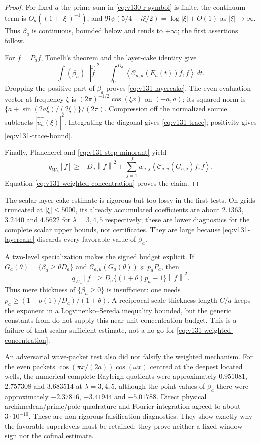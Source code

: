 \documentclass[11pt]{article}
\theoremstyle{remark}
\newcommand{\norm}[1]{\left\lVert #1\right\rVert}
\newcommand{\ip}[2]{\left\langle #1,#2\right\rangle}
\begin{document}
\begin{proof}
For fixed $a$ the prime sum in \eqref{eq:v130-r-symbol} is finite, the
continuum term is $O_a((1+|\xi|)^{-1})$, and
$\Re\psi(5/4+i\xi/2)=\log|\xi|+O(1)$ as $|\xi|\to\infty$.
Thus $\beta_a$ is continuous, bounded below and tends to $+\infty$;
the first assertions follow.

For $f=P_af$, Tonelli's theorem and the layer-cake identity give
\[
 \int(\beta_a)_-|\widehat{\widetilde f}|^2
 =\int_0^{D_a}\ip{\mathcal C_{a,u}(E_a(t))f}f\,dt.
\]
Dropping the positive part of $\beta_a$ proves
\eqref{eq:v131-layercake}.  The even evaluation vector at frequency
$\xi$ is $(2\pi)^{-1/2}\cos(\xi x)$ on $(-a,a)$; its squared norm is
$\{a+\sin(2a\xi)/(2\xi)\}/(2\pi)$.  Compression off the normalized
source subtracts $|\widehat{\widetilde u_a}(\xi)|^2$.  Integrating the
diagonal gives \eqref{eq:v131-trace}; positivity gives
\eqref{eq:v131-trace-bound}.

Finally, Plancherel and \eqref{eq:v131-step-minorant} yield
\[
 q_{W_\lambda}[f]
 \ge -D_a\norm f^2+
       \sum_{j=1}^Jw_{a,j}\ip{\mathcal C_{a,u}(G_{a,j})f}f.
\]
Equation \eqref{eq:v131-weighted-concentration} proves the claim.
\end{proof}

The scalar layer-cake estimate is rigorous but too lossy in the first
tests.  On grids truncated at $|\xi|\le5000$, its already accumulated
coefficients are about $2.1363$, $3.2440$ and $4.5622$ for
$\lambda=3,4,5$ respectively; these are lower diagnostics for the
complete scalar upper bounds, not certificates.  They are large
because \eqref{eq:v131-layercake} discards every favorable value of
$\beta_a$.

A two-level specialization makes the signed budget explicit.  If
$G_a(\theta)=\{\beta_a\ge\theta D_a\}$ and
$\mathcal C_{a,u}(G_a(\theta))\succeq p_aP_a$, then
\begin{equation}\label{eq:v131-two-level}
 q_{W_\lambda}[f]
 \ge D_a\{(1+\theta)p_a-1\}\norm f^2.
\end{equation}
Thus mere thickness of $\{\beta_a\ge0\}$ is insufficient: one needs
$p_a\ge(1-o(1)/D_a)/(1+\theta)$.  A reciprocal-scale thickness
length $C/a$ keeps the exponent in a Logvinenko--Sereda inequality
bounded, but the generic constants from
\cite{Kovrijkine2000} do not supply this near-unit concentration
budget.  This is a failure of that scalar sufficient estimate, not a
no-go for \eqref{eq:v131-weighted-concentration}.

An adversarial wave-packet test also did not falsify the weighted
mechanism.  For the even packets
$\cos(\pi x/(2a))\cos(\omega x)$ centred at the deepest located wells,
the numerical complete Rayleigh quotients were approximately
$0.951081$, $2.757308$ and $3.683514$ at $\lambda=3,4,5$, although the
point values of $\beta_a$ there were approximately $-2.37816$,
$-3.41944$ and $-5.01788$.  Direct physical archimedean/prime/pole
quadrature and Fourier integration agreed to about $3\cdot10^{-10}$.
These are non-rigorous falsification diagnostics.  They show exactly
why the favorable superlevels must be retained; they prove neither a
fixed-window sign nor the cofinal estimate.
\end{document}
